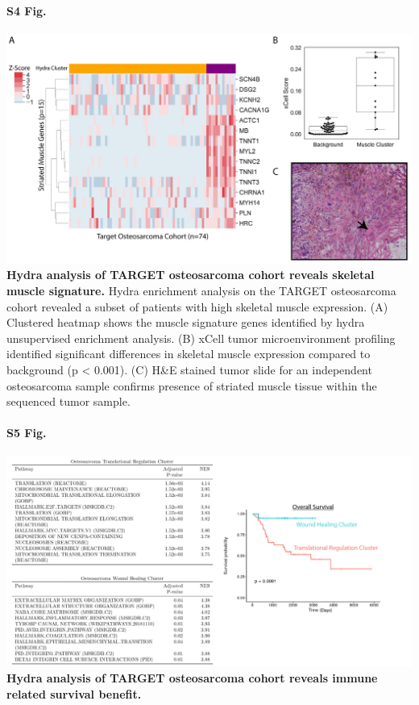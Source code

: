 \documentclass[10pt,letterpaper]{article}
\begin{document}
\paragraph*{S4 Fig.}
\includegraphics[width=\textwidth]{img/muscle-signature-genes-2x}
\label{S4_Fig} {\bf Hydra analysis of TARGET osteosarcoma cohort reveals skeletal muscle signature.} Hydra enrichment analysis on the TARGET osteosarcoma cohort revealed a subset of patients with high skeletal muscle expression. (A) Clustered heatmap shows the muscle signature genes identified by hydra unsupervised enrichment analysis. (B) xCell tumor microenvironment profiling identified significant differences in skeletal muscle expression compared to background (p < 0.001). (C) H\&E stained tumor slide for an independent osteosarcoma sample confirms presence of striated muscle tissue within the sequenced tumor sample.

\paragraph*{S5 Fig.}
\includegraphics[width=\textwidth]{img/osteosarcoma-survival-2x}
\label{S5_Fig} {\bf Hydra analysis of TARGET osteosarcoma cohort reveals immune related survival benefit.} 
\end{document}
